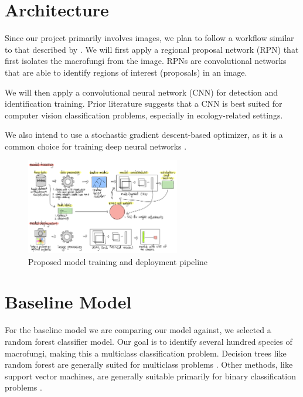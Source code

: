 \documentclass{article} %
\begin{document}
\section{Architecture}
Since our project primarily involves images, we plan to follow a workflow similar to that described by \cite{S.RenK.HeEtAl.FasterRCNNRealTime.2017}. We will first apply a regional proposal network (RPN) that first isolates the macrofungi from the image. RPNs are convolutional networks that are able to identify regions of interest (proposals) in an image.

We will then apply a convolutional neural network (CNN) for detection and identification training. Prior literature \citep{BarreStoverEtAl.LeafNetComputerVision.2017} suggests that a CNN is best suited for computer vision classification problems, especially in ecology-related settings.

We also intend to use a stochastic gradient descent-based optimizer, as it is a common choice for training deep neural networks \citep{JamesWittenEtAl.IntroductionStatisticalLearning.2023}.

\begin{figure}[h]
  \begin{center}
  \includegraphics[width=0.6\textwidth]{figures/model.png}
  \end{center}
  \caption{Proposed model training and deployment pipeline}
\end{figure}

\section{Baseline Model}
For the baseline model we are comparing our model against, we selected a random forest classifier model. Our goal is to identify several hundred species of macrofungi, making this a multiclass classification problem. Decision trees like random forest are generally suited for multiclass problems \citep{GallRazaviEtAl.IntroductionRandomForests.2012}. Other methods, like support vector machines, are generally suitable primarily for binary classification problems \citep{JamesWittenEtAl.IntroductionStatisticalLearning.2023}. 
\end{document}
